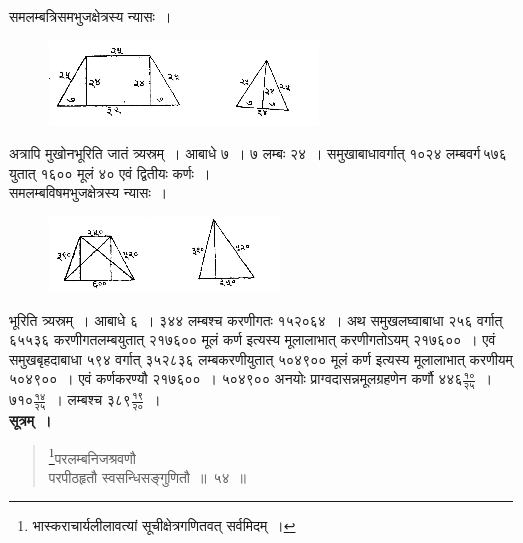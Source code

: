 \documentclass[11pt, openany]{book}
\begin{document}
 समलम्बत्रिसमभुजक्षेत्रस्य न्यासः~। 
\vspace{-2mm}

 \begin{figure}[h!]
    \centering
    \includegraphics[scale=0.85]{graphics/capture64.png}
\end{figure}
\newpage

 अत्रापि मुखोनभूरिति जातं त्र्यस्रम्~। आबाधे ७~। ७ लम्बः
२४~। समुखाबाधावर्गात् १०२४ लम्बवर्ग\textendash \,५७६\textendash \,युतात् १६०० मूलं
४० एवं द्वितीयः कर्णः~। \\

\vspace{-2mm}
 समलम्बविषमभुजक्षेत्रस्य न्यासः~। 
\vspace{-2mm}

\begin{figure}[h!]
    \centering
    \includegraphics[scale=0.85]{graphics/capture65.png}
\end{figure}
\vspace{-2mm}

 भूरिति त्र्यस्रम्~। आबाधे ६~। ३४४ लम्बश्च करणीगतः
१५२०६४~। अथ समुखलघ्वाबाधा २५६ वर्गात् ६५५३६
करणीगतलम्बयुतात् २१७६०० मूलं कर्ण इत्यस्य मूलालाभात्
करणीगतोऽयम् २१७६००~। एवं समुखबृहदाबाधा ५९४ वर्गात्
३५२८३६ लम्बकरणीयुतात् ५०४९०० मूलं कर्ण इत्यस्य मूलालाभात् करणीयम् ५०४९००~। एवं कर्णकरण्यौ २१७६००~। ५०४९००
अनयोः प्राग्वदासन्नमूलग्रहणेन कर्णौ
$\mbox{४४६}\frac{\mbox{१०}}{\mbox{२५}}$~। 
$\mbox{७१०}\frac{\mbox{१४}}{\mbox{२५}}$~। 
लम्बश्च
$\mbox{३८९}\frac{\mbox{१९}}{\mbox{२०}}$~। \\

\setcounter{footnote}{0}
 \textbf{सूत्रम्~।} 
\begin{quote}
    \bs 
\footnote{भास्कराचार्यलीलावत्यां सूचीक्षेत्रगणितवत् सर्वमिदम्~।}परलम्बनिजश्रवणौ \\
परपीठहृतौ स्वसन्धिसङ्गुणितौ~॥~५४~॥
\end{quote}
\end{document}
